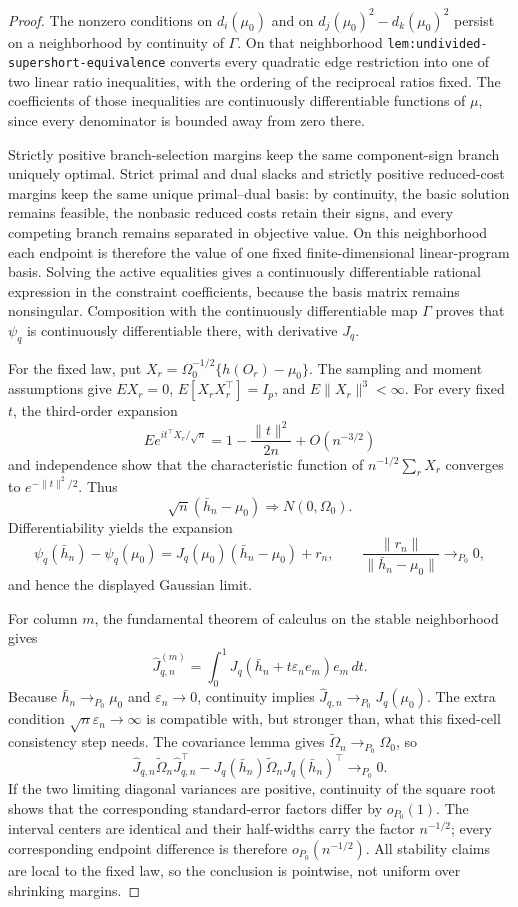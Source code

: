 \documentclass{article}
\begin{document}
\begin{proof}
The nonzero conditions on \(d_i(\mu_0)\) and on \(d_j(\mu_0)^2-d_k(\mu_0)^2\) persist on a neighborhood by continuity of \(\Gamma\).  On that neighborhood \texttt{lem:undivided-supershort-equivalence} converts every quadratic edge restriction into one of two linear ratio inequalities, with the ordering of the reciprocal ratios fixed.  The coefficients of those inequalities are continuously differentiable functions of \(\mu\), since every denominator is bounded away from zero there.

Strictly positive branch-selection margins keep the same component-sign branch uniquely optimal.  Strict primal and dual slacks and strictly positive reduced-cost margins keep the same unique primal--dual basis: by continuity, the basic solution remains feasible, the nonbasic reduced costs retain their signs, and every competing branch remains separated in objective value.  On this neighborhood each endpoint is therefore the value of one fixed finite-dimensional linear-program basis.  Solving the active equalities gives a continuously differentiable rational expression in the constraint coefficients, because the basis matrix remains nonsingular.  Composition with the continuously differentiable map \(\Gamma\) proves that \(\psi_q\) is continuously differentiable there, with derivative \(J_q\).

For the fixed law, put \(X_r=\Omega_0^{-1/2}\{h(O_r)-\mu_0\}\).  The sampling and moment assumptions give \(E X_r=0\), \(E[X_rX_r^\top]=I_p\), and \(E\|X_r\|^3<\infty\).  For every fixed \(t\), the third-order expansion
\[
 E e^{it^\top X_r/\sqrt n}
 =1-\frac{\|t\|^2}{2n}+O(n^{-3/2})
\]
and independence show that the characteristic function of \(n^{-1/2}\sum_rX_r\) converges to \(e^{-\|t\|^2/2}\).  Thus
\[
 \sqrt n(\bar h_n-\mu_0)\Rightarrow N(0,\Omega_0).
\]
Differentiability yields the expansion
\[
 \psi_q(\bar h_n)-\psi_q(\mu_0)
 =J_q(\mu_0)(\bar h_n-\mu_0)+r_n,
 \qquad
 \frac{\|r_n\|}{\|\bar h_n-\mu_0\|}\to_{P_0}0,
\]
and hence the displayed Gaussian limit.

For column \(m\), the fundamental theorem of calculus on the stable neighborhood gives
\[
 \widehat J_{q,n}^{(m)}
 =\int_0^1J_q(\bar h_n+t\varepsilon_ne_m)e_m\,dt.
\]
Because \(\bar h_n\to_{P_0}\mu_0\) and \(\varepsilon_n\to0\), continuity implies \(\widehat J_{q,n}\to_{P_0}J_q(\mu_0)\).  The extra condition \(\sqrt n\varepsilon_n\to\infty\) is compatible with, but stronger than, what this fixed-cell consistency step needs.  The covariance lemma gives \(\widetilde\Omega_n\to_{P_0}\Omega_0\), so
\[
 \widehat J_{q,n}\widetilde\Omega_n\widehat J_{q,n}^\top
 -J_q(\bar h_n)\widetilde\Omega_nJ_q(\bar h_n)^\top
 \to_{P_0}0.
\]
If the two limiting diagonal variances are positive, continuity of the square root shows that the corresponding standard-error factors differ by \(o_{P_0}(1)\).  The interval centers are identical and their half-widths carry the factor \(n^{-1/2}\); every corresponding endpoint difference is therefore \(o_{P_0}(n^{-1/2})\).  All stability claims are local to the fixed law, so the conclusion is pointwise, not uniform over shrinking margins.
\end{proof}
\end{document}
